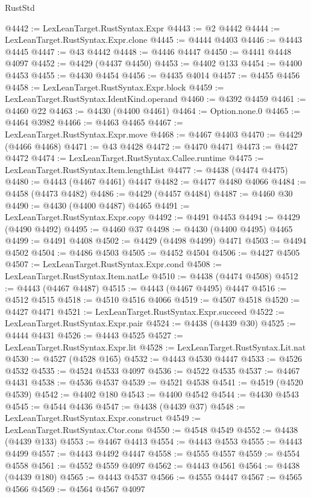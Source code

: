 \begin{lexlean}{RustStd}
\begin{coremodule}
@4442 := LexLeanTarget.RustSyntax.Expr
@4443 := @2 @4442
@4444 := LexLeanTarget.RustSyntax.Expr.clone
@4445 := @4444 @4403
@4446 := @4443 @4445
@4447 := @43 @4442
@4448 := @4446 @4447
@4450 := @4441 @4448 @4097
@4452 := @4429 (@4437 @4450)
@4453 := @4402 @133
@4454 := @4400 @4453
@4455 := @4430 @4454
@4456 := @4435 @4014
@4457 := @4455 @4456
@4458 := LexLeanTarget.RustSyntax.Expr.block
@4459 := LexLeanTarget.RustSyntax.IdentKind.operand
@4460 := @4392 @4459
@4461 := @4460 @22
@4463 := @4430 (@4400 @4461)
@4464 := Option.none.{0}
@4465 := @4464 @3982
@4466 := @4463 @4465
@4467 := LexLeanTarget.RustSyntax.Expr.move
@4468 := @4467 @4403
@4470 := @4429 (@4466 @4468)
@4471 := @43 @4428
@4472 := @4470 @4471
@4473 := @4427 @4472
@4474 := LexLeanTarget.RustSyntax.Callee.runtime
@4475 := LexLeanTarget.RustSyntax.Item.lengthList
@4477 := @4438 (@4474 @4475)
@4480 := @4443 (@4467 @4461) @4447
@4482 := @4477 @4480 @4066
@4484 := @4458 (@4473 @4482)
@4486 := @4429 (@4457 @4484)
@4487 := @4460 @30
@4490 := @4430 (@4400 @4487) @4465
@4491 := LexLeanTarget.RustSyntax.Expr.copy
@4492 := @4491 @4453
@4494 := @4429 (@4490 @4492)
@4495 := @4460 @37
@4498 := @4430 (@4400 @4495) @4465
@4499 := @4491 @4408
@4502 := @4429 (@4498 @4499) @4471
@4503 := @4494 @4502
@4504 := @4486 @4503
@4505 := @4452 @4504
@4506 := @4427 @4505
@4507 := LexLeanTarget.RustSyntax.Expr.cond
@4508 := LexLeanTarget.RustSyntax.Item.natLe
@4510 := @4438 (@4474 @4508)
@4512 := @4443 (@4467 @4487)
@4515 := @4443 (@4467 @4495) @4447
@4516 := @4512 @4515
@4518 := @4510 @4516 @4066
@4519 := @4507 @4518
@4520 := @4427 @4471
@4521 := LexLeanTarget.RustSyntax.Expr.succeed
@4522 := LexLeanTarget.RustSyntax.Expr.pair
@4524 := @4438 (@4439 @30)
@4525 := @4444 @4431
@4526 := @4443 @4525
@4527 := LexLeanTarget.RustSyntax.Expr.lit
@4528 := LexLeanTarget.RustSyntax.Lit.nat
@4530 := @4527 (@4528 @165)
@4532 := @4443 @4530 @4447
@4533 := @4526 @4532
@4535 := @4524 @4533 @4097
@4536 := @4522 @4535
@4537 := @4467 @4431
@4538 := @4536 @4537
@4539 := @4521 @4538
@4541 := @4519 (@4520 @4539)
@4542 := @4402 @180
@4543 := @4400 @4542
@4544 := @4430 @4543
@4545 := @4544 @4436
@4547 := @4438 (@4439 @37)
@4548 := LexLeanTarget.RustSyntax.Expr.construct
@4549 := LexLeanTarget.RustSyntax.Ctor.cons
@4550 := @4548 @4549
@4552 := @4438 (@4439 @133)
@4553 := @4467 @4413
@4554 := @4443 @4553
@4555 := @4443 @4499
@4557 := @4443 @4492 @4447
@4558 := @4555 @4557
@4559 := @4554 @4558
@4561 := @4552 @4559 @4097
@4562 := @4443 @4561
@4564 := @4438 (@4439 @180)
@4565 := @4443 @4537
@4566 := @4555 @4447
@4567 := @4565 @4566
@4569 := @4564 @4567 @4097

\end{coremodule}
\end{lexlean}
